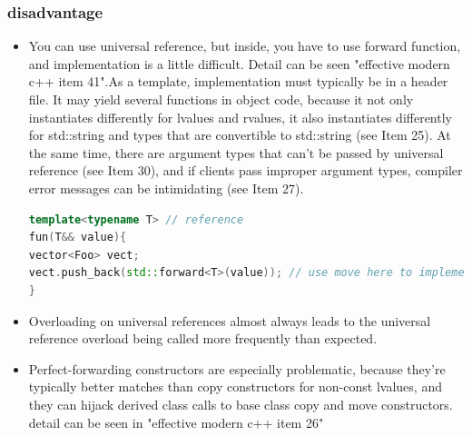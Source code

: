 \documentclass[a4paper,12pt,twoside]{book}
\begin{document}
\subsubsection{disadvantage}
\begin{itemize}
\item You can use universal reference,  but inside, you have to use forward function, and implementation is a little difficult.  Detail can be seen "effective modern c++ item 41".As a template, implementation must typically be in a header file. It may yield several functions in object code, because it not only instantiates differently for lvalues and rvalues, it also instantiates differently for std::string and types that are convertible to std::string (see Item 25). At the same time, there are argument types that can't be passed by universal reference (see Item 30), and if clients pass improper argument types, compiler error messages can be intimidating (see Item 27).

\begin{lstlisting}[frame=single, language=c++]
template<typename T> // reference
fun(T&& value){
vector<Foo> vect;
vect.push_back(std::forward<T>(value)); // use move here to implement
}
\end{lstlisting}


\item Overloading on universal references almost always leads to the universal reference overload being called more frequently than expected.

\item Perfect-forwarding constructors are especially problematic, because they're typically better matches than copy constructors for non-const lvalues, and they can hijack derived class calls to base class copy and move constructors. detail can be seen in "effective modern c++ item 26"

\end{itemize}
\end{document}
